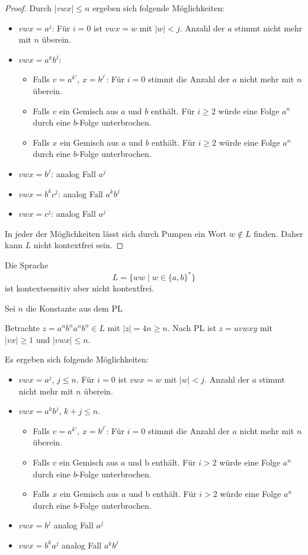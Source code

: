{\begin{proof}
  Durch $|vwx| \le n$ ergeben sich folgende Möglichkeiten:
  \begin{itemize}
  \item $vwx = a^j$: 
    Für $i=0$ ist $vwx=w$ mit $|w| < j$.
    Anzahl der $a$ stimmt nicht mehr mit $n$ überein.
  \item $vwx = a^kb^j$:
    \begin{itemize}
    \item Falls $v = a^{k'}$, $x = b^{j'}$: Für $i=0$ stimmt die Anzahl der $a$ nicht mehr mit $n$ überein.
    \item Falls $v$ ein Gemisch aus $a$ und $b$ enthält.
      Für $i\ge 2$ würde eine Folge $a^n$ durch eine $b$-Folge unterbrochen.
    \item Falls $x$ ein Gemisch aus $a$ und $b$ enthält.
      Für $i \ge2$ würde eine Folge $a^n$ durch eine $b$-Folge unterbrochen.
    \end{itemize}
  \item $vwx = b^j$: analog Fall $a^j$
  \item $vwx = b^kc^j$: analog Fall $a^kb^j$
  \item $vwx = c^j$: analog Fall $a^j$
  \end{itemize}
  In jeder der Möglichkeiten lässt sich durch Pumpen ein Wort $w \not \in L$ finden.
  Daher kann $L$ nicht kontextfrei sein.
\end{proof}

\begin{Bsp} Die Sprache
  \begin{displaymath}
    L = \{ww \mid w \in \{a,b\}^*\}
  \end{displaymath}
  ist kontextsensitiv aber nicht kontextfrei.

  Sei $n$ die Konstante aus dem PL

  Betrachte $z = a^nb^na^nb^n \in L$ mit $|z| = 4n \ge n$.
  Nach PL ist $z = uvwxy$ mit $|vx| \ge 1$ und $|vwx| \le n$.

  Es ergeben sich folgende Möglichkeiten:
  \begin{itemize}
  \item $vwx = a^j$, $j \le n$.
    Für $i=0$ ist $vwx=w$ mit $|w| < j$.
    Anzahl der $a$ stimmt nicht mehr mit $n$ überein.
  \item $vwx = a^kb^j$, $k+j \le n$.

    \begin{itemize}
    \item Falls $v = a^{k'}$, $x = b^{j'}$: Für $i=0$ stimmt die Anzahl der $a$ nicht mehr mit $n$ überein.
    \item Falls $v$ ein Gemisch aus $a$ und b enthält.
      Für $i>2$ würde eine Folge $a^n$ durch eine $b$-Folge unterbrochen.
    \item Falls $x$ ein Gemisch aus $a$ und b enthält.
      Für $i>2$ würde eine Folge $a^n$ durch eine $b$-Folge unterbrochen.
    \end{itemize}
  \item $vwx = b^j$ analog Fall $a^j$
  \item $vwx = b^ka^j$ analog Fall $a^kb^j$
  \end{itemize}
\end{Bsp}

}
